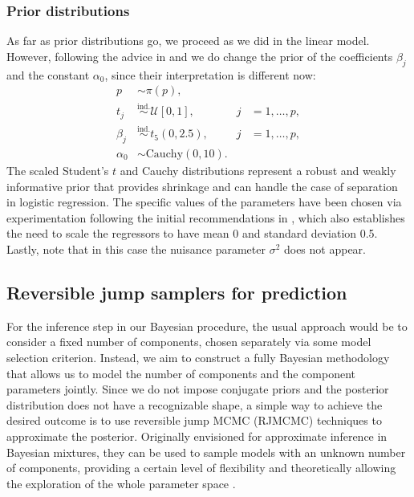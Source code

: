 \documentclass{article}
\numberwithin{equation}{section}
\theoremstyle{plain}
\theoremstyle{definition}
\begin{document}
\subsubsection*{Prior distributions}

As far as prior distributions go, we proceed as we did in the linear model. However, following the advice in \citet{gelman2008weakly} and \citet{ghosh2018use} we do change the prior of the coefficients \(\beta_j\) and the constant \(\alpha_0\), since their interpretation is different now:
\begin{equation}\label{eq:prior-logistic}
  \begin{aligned}
      p & \sim \pi(p),\\
      t_j & \stackrel{\text{ind.}}{\sim}\mathcal U[0, 1],\quad & j &= 1,\dots,p,\\
      \beta_j & \stackrel{\text{ind.}}{\sim} t_5(0, 2.5),\quad & j &= 1,\dots,p,\\
      \alpha_0 & \sim \text{Cauchy}(0, 10).
  \end{aligned}
  \end{equation}
The scaled Student's \(t\) and Cauchy distributions represent a robust and weakly informative prior that provides shrinkage and can handle the case of separation in logistic regression. The specific values of the parameters have been chosen via experimentation following the initial recommendations in \citet{ghosh2018use}, which also establishes the need to scale the regressors to have mean 0 and standard deviation 0.5. Lastly, note that in this case the nuisance parameter \(\sigma^2\) does not appear.

\subsection{Reversible jump samplers for prediction}\label{sec:rjmcmc}

For the inference step in our Bayesian procedure, the usual approach would be to consider a fixed number of components, chosen separately via some model selection criterion. Instead, we aim to construct a fully Bayesian methodology that allows us to model the number of components and the component parameters jointly. Since we do not impose conjugate priors and the posterior distribution does not have a recognizable shape, a simple way to achieve the desired outcome is to use reversible jump MCMC (RJMCMC) techniques to approximate the posterior. Originally envisioned for approximate inference in Bayesian mixtures, they can be used to sample models with an unknown number of components, providing a certain level of flexibility and theoretically allowing the exploration of the whole parameter space \citep[see][]{richardson1997bayesian}.
\end{document}

